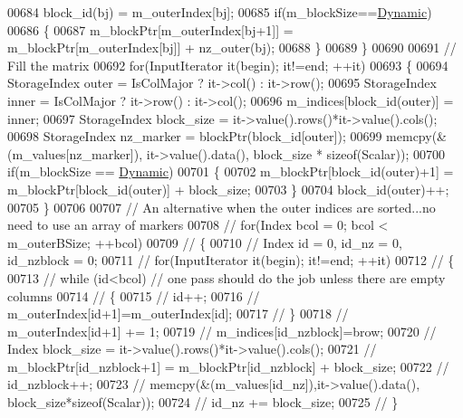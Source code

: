 \begin{DoxyCode}
00684         block\_id(bj) = m\_outerIndex[bj];
00685         \textcolor{keywordflow}{if}(m\_blockSize==\hyperlink{namespace_eigen_ad81fa7195215a0ce30017dfac309f0b2}{Dynamic})
00686         \{
00687           m\_blockPtr[m\_outerIndex[bj+1]] = m\_blockPtr[m\_outerIndex[bj]] + nz\_outer(bj);
00688         \}
00689       \}
00690 
00691       \textcolor{comment}{// Fill the matrix}
00692       \textcolor{keywordflow}{for}(InputIterator it(begin); it!=end; ++it)
00693       \{
00694         StorageIndex outer = IsColMajor ? it->col() : it->row();
00695         StorageIndex inner = IsColMajor ? it->row() : it->col();
00696         m\_indices[block\_id(outer)] = inner;
00697         StorageIndex block\_size = it->value().rows()*it->value().cols();
00698         StorageIndex nz\_marker = blockPtr(block\_id[outer]);
00699         memcpy(&(m\_values[nz\_marker]), it->value().data(), block\_size * \textcolor{keyword}{sizeof}(Scalar));
00700         \textcolor{keywordflow}{if}(m\_blockSize == \hyperlink{namespace_eigen_ad81fa7195215a0ce30017dfac309f0b2}{Dynamic})
00701         \{
00702           m\_blockPtr[block\_id(outer)+1] = m\_blockPtr[block\_id(outer)] + block\_size;
00703         \}
00704         block\_id(outer)++;
00705       \}
00706 
00707       \textcolor{comment}{// An alternative when the outer indices are sorted...no need to use an array of markers}
00708 \textcolor{comment}{//      for(Index bcol = 0; bcol < m\_outerBSize; ++bcol)}
00709 \textcolor{comment}{//      \{}
00710 \textcolor{comment}{//      Index id = 0, id\_nz = 0, id\_nzblock = 0;}
00711 \textcolor{comment}{//      for(InputIterator it(begin); it!=end; ++it)}
00712 \textcolor{comment}{//      \{}
00713 \textcolor{comment}{//        while (id<bcol) // one pass should do the job unless there are empty columns}
00714 \textcolor{comment}{//        \{}
00715 \textcolor{comment}{//          id++;}
00716 \textcolor{comment}{//          m\_outerIndex[id+1]=m\_outerIndex[id];}
00717 \textcolor{comment}{//        \}}
00718 \textcolor{comment}{//        m\_outerIndex[id+1] += 1;}
00719 \textcolor{comment}{//        m\_indices[id\_nzblock]=brow;}
00720 \textcolor{comment}{//        Index block\_size = it->value().rows()*it->value().cols();}
00721 \textcolor{comment}{//        m\_blockPtr[id\_nzblock+1] = m\_blockPtr[id\_nzblock] + block\_size;}
00722 \textcolor{comment}{//        id\_nzblock++;}
00723 \textcolor{comment}{//        memcpy(&(m\_values[id\_nz]),it->value().data(), block\_size*sizeof(Scalar));}
00724 \textcolor{comment}{//        id\_nz += block\_size;}
00725 \textcolor{comment}{//      \}}

\end{DoxyCode}
